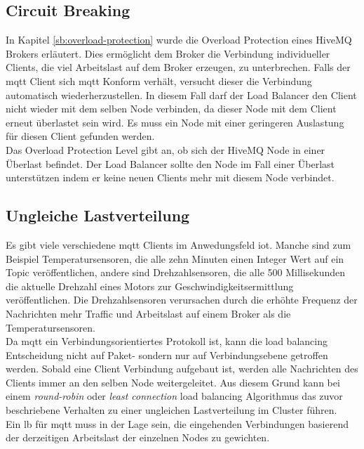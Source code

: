 \subsection{Circuit Breaking}
In Kapitel \ref{sb:overload-protection} wurde die Overload Protection eines HiveMQ Brokers erläutert. Dies ermöglicht dem Broker die Verbindung individueller Clients, die viel Arbeitslast auf dem Broker erzeugen, zu unterbrechen. Falls der \ac{mqtt} Client sich \ac{mqtt} Konform verhält, versucht dieser die Verbindung automatisch wiederherzustellen.
In diesem Fall darf der Load Balancer den Client nicht wieder mit dem selben Node verbinden, da dieser Node mit dem Client erneut überlastet sein wird. Es muss ein Node mit einer geringeren Auslastung für diesen Client gefunden werden.
\\
Das Overload Protection Level gibt an, ob sich der HiveMQ Node in einer Überlast befindet. Der Load Balancer sollte den Node im Fall einer Überlast unterstützen indem er keine neuen Clients mehr mit diesem Node verbindet.

\subsection{Ungleiche Lastverteilung} \label{sp:load}
Es gibt viele verschiedene \ac{mqtt} Clients im Anwedungsfeld \ac{iot}. Manche sind zum Beispiel Temperatursensoren, die alle zehn Minuten einen Integer Wert auf ein Topic veröffentlichen, andere sind Drehzahlsensoren, die alle 500 Millisekunden die aktuelle Drehzahl eines Motors zur Geschwindigkeitsermittlung veröffentlichen.
Die Drehzahlsensoren verursachen durch die erhöhte Frequenz der Nachrichten mehr Traffic und Arbeitslast auf einem Broker als die Temperatursensoren.
\\
Da \ac{mqtt} ein Verbindungsorientiertes Protokoll ist, kann die load balancing Entscheidung nicht auf Paket- sondern nur auf Verbindungsebene getroffen werden. Sobald eine Client Verbindung aufgebaut ist, werden alle Nachrichten des Clients immer an den selben Node weitergeleitet.
Aus diesem Grund kann bei einem \textit{round-robin} oder \textit{least connection} load balancing Algorithmus das zuvor beschriebene Verhalten zu einer ungleichen Lastverteilung im Cluster führen.
\\
Ein \ac{lb} für \ac{mqtt} muss in der Lage sein, die eingehenden Verbindungen basierend der derzeitigen Arbeitslast der einzelnen Nodes zu gewichten.

\begin{comment}
\ac{mqtt} Clients haben keine Grenze an Topics die sie abonnieren können. Mit einer Wildcard Subscription ist es sogar möglich, alle Topics die auf einem Broker existieren mit einer Subscription zu abonnieren: \verb|#|. Ein Client, der eine solche Subscription hat, verursacht mehr Traffic und Arbeitslast auf einem Broker als ein Client, der alle zehn Minuten einen Integer Wert auf dem Topic \verb|sensors/temperature| veröffentlicht.
Wie in Kapitel \ref{s:domain} erläutert sind im Anwendungsfeld \ac{iot} die beschriebenen Clients keine seltenheit.
\end{comment}

